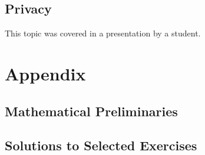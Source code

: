 \documentclass{book}
\begin{document}

  \chapter{Privacy}\label{sec:sd:privacy}
   This topic was covered in a presentation by a student.
   

%
%  

\part{Appendix}

\appendix

\chapter{Mathematical Preliminaries}\label{sec:math}


\chapter{Solutions to Selected Exercises}


\tocentryBib


%
%
%
\end{document}
